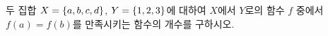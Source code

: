 두 집합 $X=\{a{,}\mkern3mu\mathopen{}b{,}\mkern3mu\mathopen{}c{,}\mkern3mu\mathopen{}d\}$, $Y=\{1{,}\mkern3mu\mathopen{}2{,}\mkern3mu\mathopen{}3\}$에 대하여 $X$에서 $Y$로의 함수 $f$ 중에서 $f(a)=f(b)$를 만족시키는 함수의 개수를 구하시오.
